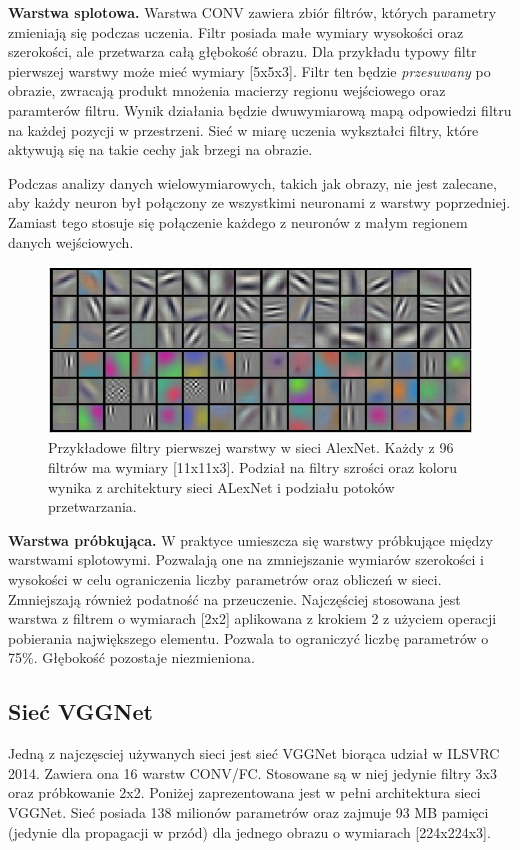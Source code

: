 \documentclass[a4paper,11pt, notitlepage, twosides, openany ]{report}
\begin{document}
	\textbf{Warstwa splotowa.} Warstwa CONV zawiera zbiór filtrów, których parametry zmieniają się podczas uczenia. Filtr posiada małe wymiary wysokości oraz szerokości, ale przetwarza całą głębokość obrazu. Dla przykładu typowy filtr pierwszej warstwy może mieć wymiary [5x5x3]. Filtr ten będzie \textit{przesuwany} po obrazie, zwracają produkt mnożenia macierzy regionu wejściowego oraz paramterów filtru. Wynik działania będzie dwuwymiarową mapą odpowiedzi filtru na każdej pozycji w przestrzeni. Sieć w miarę uczenia wykształci filtry, które aktywują się na takie cechy jak brzegi na obrazie. 

	Podczas analizy danych wielowymiarowych, takich jak obrazy, nie jest zalecane, aby każdy neuron był połączony ze wszystkimi neuronami z warstwy poprzedniej. Zamiast tego stosuje się połączenie każdego z neuronów z małym regionem danych wejściowych. 

	\begin{figure}[h]
		\centering
		\includegraphics[width=1\textwidth]{filters.jpeg}
		\caption{Przykładowe filtry pierwszej warstwy w sieci AlexNet. Każdy z 96 filtrów ma wymiary [11x11x3]. Podział na filtry szrości oraz koloru wynika z architektury sieci ALexNet i podziału potoków przetwarzania.}
		\label{convlay}
	\end{figure}

	\textbf{Warstwa próbkująca.} W praktyce umieszcza się warstwy próbkujące między warstwami splotowymi. Pozwalają one na zmniejszanie wymiarów szerokości i wysokości w celu ograniczenia liczby parametrów oraz obliczeń w sieci. Zmniejszają również podatność na przeuczenie. Najczęściej stosowana jest warstwa z filtrem o wymiarach [2x2] aplikowana z krokiem 2 z użyciem operacji pobierania największego elementu. Pozwala to ograniczyć liczbę parametrów o 75\%. Głębokość pozostaje niezmieniona.

	\subsection{Sieć VGGNet}
	Jedną z najczęsciej używanych sieci jest sieć VGGNet \cite{SimonyanZ14a} biorąca udział w ILSVRC 2014. Zawiera ona 16 warstw CONV/FC. Stosowane są w niej jedynie filtry 3x3 oraz próbkowanie 2x2. Poniżej zaprezentowana jest w pełni architektura sieci VGGNet. Sieć posiada 138 milionów parametrów oraz zajmuje 93 MB pamięci (jedynie dla propagacji w przód) dla jednego obrazu o wymiarach [224x224x3].
\end{document}
